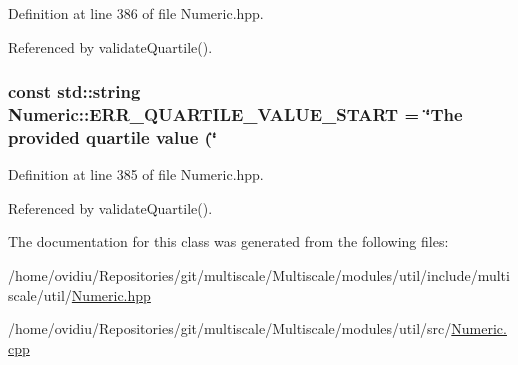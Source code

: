 \-Definition at line 386 of file \-Numeric.\-hpp.



\-Referenced by validate\-Quartile().

\hypertarget{classmultiscale_1_1Numeric_ac76a6a6f1fa8abae2855f4fed0f0d97e}{
\subsubsection[{\-E\-R\-R\-\_\-\-Q\-U\-A\-R\-T\-I\-L\-E\-\_\-\-V\-A\-L\-U\-E\-\_\-\-S\-T\-A\-R\-T}]{\setlength{\rightskip}{0pt plus 5cm}const std\-::string {\bf \-Numeric\-::\-E\-R\-R\-\_\-\-Q\-U\-A\-R\-T\-I\-L\-E\-\_\-\-V\-A\-L\-U\-E\-\_\-\-S\-T\-A\-R\-T} = \char`\"{}\-The provided {\bf quartile} value (\char`\"{}}}\label{classmultiscale_1_1Numeric_ac76a6a6f1fa8abae2855f4fed0f0d97e}


\-Definition at line 385 of file \-Numeric.\-hpp.



\-Referenced by validate\-Quartile().



\-The documentation for this class was generated from the following files\-:\begin{DoxyCompactItemize}
\item 
/home/ovidiu/\-Repositories/git/multiscale/\-Multiscale/modules/util/include/multiscale/util/\hyperlink{Numeric_8hpp}{\-Numeric.\-hpp}\item 
/home/ovidiu/\-Repositories/git/multiscale/\-Multiscale/modules/util/src/\hyperlink{Numeric_8cpp}{\-Numeric.\-cpp}\end{DoxyCompactItemize}
